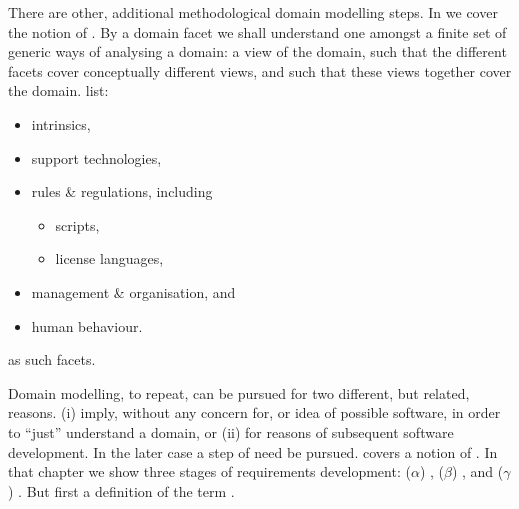 \label{primer:Domain Facets}

\begynd
\pind There are other, additional methodological domain modelling steps.
\pind In \cite[Chapter\,8, Pages 205--240]{BjornerMonograph2020} we
      cover the notion of .
\begynd
\pind By a domain facet we shall understand one amongst a finite set
      of generic ways of analysing a domain:
\begynd
\pind a view of the domain,
\pind such that the different facets 
\pind cover conceptually different views, 
\pind and such that these views together
\pind cover the domain. 
\afslut
\afslut
\pind {} list:
\begin{multicols}{2}
\begin{itemize}
\item intrinsics,
\item support technologies,
\item rules \& regulations, including
\begin{itemize}
\item scripts,
\item license languages,
\end{itemize}
\item management \& organisation, and
\item human behaviour.
\end{itemize}
\end{multicols}\noindent as such facets.
\afslut

\label{primer:Requirements Engineering}

\begynd
\pind Domain modelling, to repeat, can be pursued for two different,
      but related, reasons.
\begynd
\pind (i) imply, without any concern for, or idea of possible
          software, in order to ``just'' understand a domain, or
\pind (ii) for reasons of subsequent software development.
\afslut
\pind In the later case a step of  need be pursued.
\begynd
\pind \cite[Chapter\,9, Pages\,243--298]{BjornerMonograph2020} covers
      a notion of .
\pind In that chapter we show three stages of requirements
      development:
\begynd
\pind ($\alpha$) ,
\pind ($\beta$) , and 
\pind ($\gamma$) .
\afslut
\mnewfoil
\pind But first a definition of the term .

